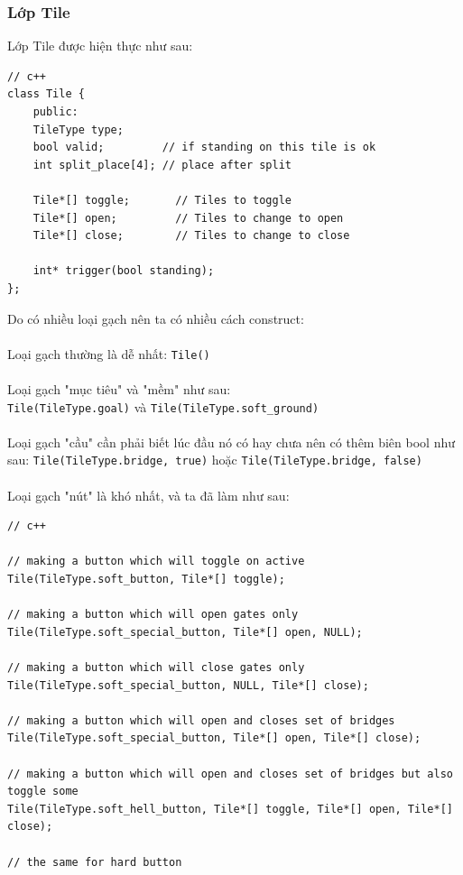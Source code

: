\documentclass[a4paper, 11pt]{article}
\begin{document}
\subsubsection{Lớp Tile}
Lớp Tile được hiện thực như sau:
\begin{verbatim}
// c++
class Tile {
    public:
    TileType type;
    bool valid;         // if standing on this tile is ok
    int split_place[4]; // place after split
    
    Tile*[] toggle;       // Tiles to toggle
    Tile*[] open;         // Tiles to change to open
    Tile*[] close;        // Tiles to change to close
    
    int* trigger(bool standing);
};
\end{verbatim}
Do có nhiều loại gạch nên ta có nhiều cách construct:\\~\\
Loại gạch thường là dễ nhất: \texttt{Tile()}\\~\\
Loại gạch "mục tiêu" và "mềm" như sau: \\\texttt{Tile(TileType.goal)} và
\texttt{Tile(TileType.soft\_ground)}\\~\\
Loại gạch "cầu" cần phải biết lúc đầu nó có hay chưa nên có thêm biên bool như sau:
\texttt{Tile(TileType.bridge, true)} hoặc \texttt{Tile(TileType.bridge, false)}\\~\\
Loại gạch "nút" là khó nhất, và ta đã làm như sau:
\begin{verbatim}
// c++

// making a button which will toggle on active
Tile(TileType.soft_button, Tile*[] toggle);
    
// making a button which will open gates only
Tile(TileType.soft_special_button, Tile*[] open, NULL);
    
// making a button which will close gates only
Tile(TileType.soft_special_button, NULL, Tile*[] close);
    
// making a button which will open and closes set of bridges
Tile(TileType.soft_special_button, Tile*[] open, Tile*[] close);
    
// making a button which will open and closes set of bridges but also toggle some
Tile(TileType.soft_hell_button, Tile*[] toggle, Tile*[] open, Tile*[] close);
    
// the same for hard button
\end{verbatim}
\end{document}
